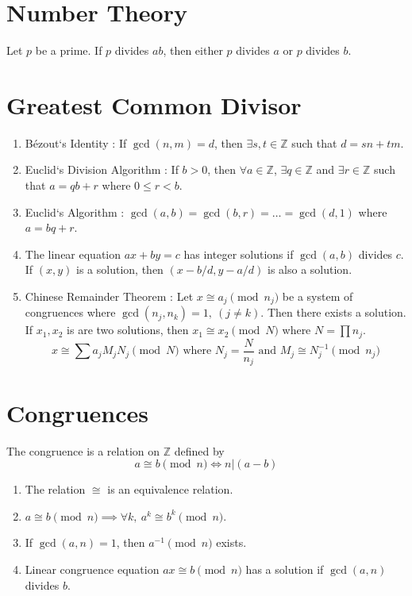 \section{Number Theory}
\begin{lemma}[Euclid]
	Let $p$ be a prime. If $p$ divides $ab$, then either $p$ divides $a$ or $p$ divides $b$.
\end{lemma}

\section{Greatest Common Divisor}
\begin{enumerate}
	\item B\'ezout`s Identity : If $\gcd(n,m)= d$, then $\exists s,t \in \mathbb{Z}$ such that $d = sn+tm$.
	\item Euclid`s Division Algorithm : If $b > 0$, then $\forall a \in \mathbb{Z}$, $\exists q \in \mathbb{Z}$ and $\exists r \in \mathbb{Z}$ such that $a = qb+r$ where $0 \le r < b$.
	\item Euclid`s Algorithm : $\gcd(a,b) = \gcd(b,r) = \dots = \gcd(d,1)$ where $a = bq+r$.
	\item The linear equation $ax+by=c$ has integer solutions if $\gcd(a,b)$ divides $c$.\\ If $(x,y)$ is a solution, then $(x-b/d,y-a/d)$ is also a solution.
	\item Chinese Remainder Theorem : Let $x \cong a_j \pmod{n_j}$ be a system of congruences where $\gcd(n_j,n_k) = 1,\ (j \ne k)$. Then there exists a solution.\\ If $x_1,x_2$ is are two solutions, then $x_1 \cong x_2 \pmod{N}$ where $N = \prod n_j$.
		$$x \cong \sum a_j M_j N_j \pmod{N} \text{ where } N_j = \frac{N}{n_j} \text{ and } M_j \cong N_j^{-1} \pmod{n_j}$$
\end{enumerate}

\section{Congruences}
\begin{definition}
	The congruence is a relation on $\mathbb{Z}$ defined by
	$$a \cong b \pmod{n} \iff n | (a-b)$$
\end{definition}
\begin{enumerate}
	\item The relation $\cong$ is an equivalence relation.
	\item $a \cong b \pmod{n} \implies \forall k,\ a^k \cong b^k \pmod{n}$.
	\item If $\gcd(a,n) = 1$, then $a^{-1} \pmod{n}$ exists.
	\item Linear congruence equation $ax \cong b \pmod{n}$ has a solution if $\gcd(a,n)$ divides $b$.
\end{enumerate}

